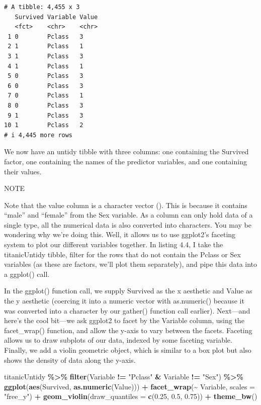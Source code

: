 \documentclass[
]{article}
\newenvironment{Shaded}{\begin{snugshade}}{\end{snugshade}}
\newcommand{\AttributeTok}[1]{\textcolor[rgb]{0.13,0.29,0.53}{#1}}
\newcommand{\FloatTok}[1]{\textcolor[rgb]{0.00,0.00,0.81}{#1}}
\newcommand{\FunctionTok}[1]{\textcolor[rgb]{0.13,0.29,0.53}{\textbf{#1}}}
\newcommand{\NormalTok}[1]{#1}
\newcommand{\SpecialCharTok}[1]{\textcolor[rgb]{0.81,0.36,0.00}{\textbf{#1}}}
\newcommand{\StringTok}[1]{\textcolor[rgb]{0.31,0.60,0.02}{#1}}
\begin{document}
\begin{verbatim}
# A tibble: 4,455 x 3
   Survived Variable Value
   <fct>    <chr>    <chr>
 1 0        Pclass   3    
 2 1        Pclass   1    
 3 1        Pclass   3    
 4 1        Pclass   1    
 5 0        Pclass   3    
 6 0        Pclass   3    
 7 0        Pclass   1    
 8 0        Pclass   3    
 9 1        Pclass   3    
10 1        Pclass   2    
# i 4,445 more rows
\end{verbatim}

We now have an untidy tibble with three columns: one containing the
Survived factor, one containing the names of the predictor variables,
and one containing their values.

NOTE

Note that the value column is a character vector (). This is because it
contains ``male'' and ``female'' from the Sex variable. As a column can
only hold data of a single type, all the numerical data is also
converted into characters. You may be wondering why we're doing this.
Well, it allows us to use ggplot2's faceting system to plot our
different variables together. In listing 4.4, I take the titanicUntidy
tibble, filter for the rows that do not contain the Pclass or Sex
variables (as these are factors, we'll plot them separately), and pipe
this data into a ggplot() call.

In the ggplot() function call, we supply Survived as the x aesthetic and
Value as the y aesthetic (coercing it into a numeric vector with
as.numeric() because it was converted into a character by our gather()
function call earlier). Next---and here's the cool bit---we ask ggplot2
to facet by the Variable column, using the facet\_wrap() function, and
allow the y-axis to vary between the facets. Faceting allows us to draw
subplots of our data, indexed by some faceting variable. Finally, we add
a violin geometric object, which is similar to a box plot but also shows
the density of data along the y-axis.

\begin{Shaded}
\begin{Highlighting}[]
\NormalTok{titanicUntidy }\SpecialCharTok{\%\textgreater{}\%}
  \FunctionTok{filter}\NormalTok{(Variable }\SpecialCharTok{!=} \StringTok{"Pclass"} \SpecialCharTok{\&}\NormalTok{ Variable }\SpecialCharTok{!=} \StringTok{"Sex"}\NormalTok{) }\SpecialCharTok{\%\textgreater{}\%}
  \FunctionTok{ggplot}\NormalTok{(}\FunctionTok{aes}\NormalTok{(Survived, }\FunctionTok{as.numeric}\NormalTok{(Value))) }\SpecialCharTok{+}
  \FunctionTok{facet\_wrap}\NormalTok{(}\SpecialCharTok{\textasciitilde{}}\NormalTok{ Variable, }\AttributeTok{scales =} \StringTok{"free\_y"}\NormalTok{) }\SpecialCharTok{+}
  \FunctionTok{geom\_violin}\NormalTok{(}\AttributeTok{draw\_quantiles =} \FunctionTok{c}\NormalTok{(}\FloatTok{0.25}\NormalTok{, }\FloatTok{0.5}\NormalTok{, }\FloatTok{0.75}\NormalTok{)) }\SpecialCharTok{+}
\FunctionTok{theme\_bw}\NormalTok{()}
\end{Highlighting}
\end{Shaded}
\end{document}
